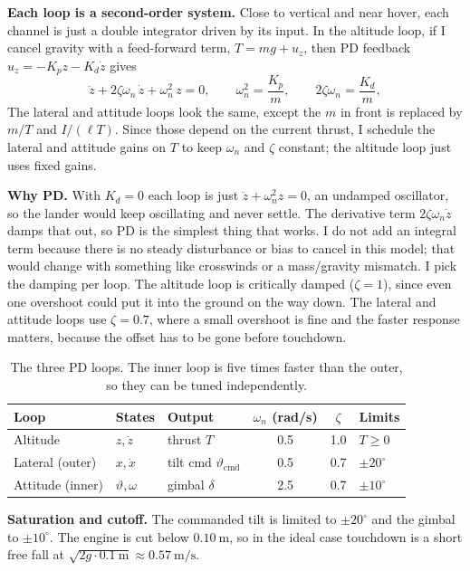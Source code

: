 \documentclass[11pt]{article}
\begin{document}
\textbf{Each loop is a second-order system.} Close to vertical and near hover, each channel is just a double integrator driven by its input. In the altitude loop, if I cancel gravity with a feed-forward term, $T=mg+u_z$, then PD feedback $u_z=-K_p z-K_d\dot z$ gives
\begin{equation}
  \ddot z + 2\zeta\omega_n\,\dot z + \omega_n^2\,z = 0,
  \qquad \omega_n^2 = \frac{K_p}{m}, \qquad 2\zeta\omega_n = \frac{K_d}{m},
\end{equation}
The lateral and attitude loops look the same, except the $m$ in front is replaced by $m/T$ and $I/(\ell T)$. Since those depend on the current thrust, I schedule the lateral and attitude gains on $T$ to keep $\omega_n$ and $\zeta$ constant; the altitude loop just uses fixed gains.

\textbf{Why PD.} With $K_d=0$ each loop is just $\ddot z+\omega_n^2 z=0$, an undamped oscillator, so the lander would keep oscillating and never settle. The derivative term $2\zeta\omega_n\dot z$ damps that out, so PD is the simplest thing that works. I do not add an integral term because there is no steady disturbance or bias to cancel in this model; that would change with something like crosswinds or a mass/gravity mismatch. I pick the damping per loop. The altitude loop is critically damped ($\zeta=1$), since even one overshoot could put it into the ground on the way down. The lateral and attitude loops use $\zeta=0.7$, where a small overshoot is fine and the faster response matters, because the offset has to be gone before touchdown.

\begin{table}[H] \centering\small
\begin{tabular}{lllccl}
\hline
Loop & States & Output & $\omega_n$ (rad/s) & $\zeta$ & Limits\\
\hline
Altitude        & $z,\dot z$         & thrust $T$                          & 0.5 & 1.0 & $T \ge 0$\\
Lateral (outer) & $x,\dot x$         & tilt cmd $\vartheta_{\mathrm{cmd}}$ & 0.5 & 0.7 & $\pm 20^\circ$\\
Attitude (inner)& $\vartheta,\omega$ & gimbal $\delta$                     & 2.5 & 0.7 & $\pm 10^\circ$\\
\hline
\end{tabular}
\caption{The three PD loops. The inner loop is five times faster than the outer, so they can be tuned independently.}
\end{table}

\textbf{Saturation and cutoff.} The commanded tilt is limited to $\pm 20^\circ$ and the gimbal to $\pm 10^\circ$. The engine is cut below $0.10~\mathrm{m}$, so in the ideal case touchdown is a short free fall at $\sqrt{2g\cdot 0.1~\mathrm{m}}\approx0.57~\mathrm{m/s}$.
\end{document}
